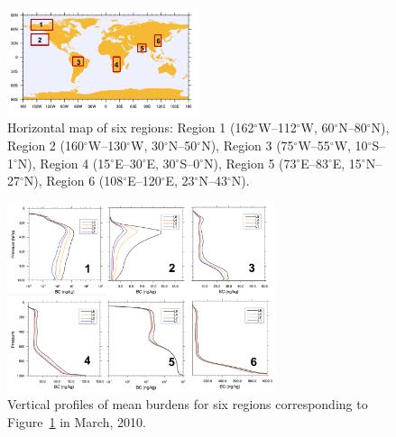 \documentclass[12pt, fullpage]{uiucthesis2009}
\begin{document}
	\begin{figure}[h] 
		\begin{center}
			\includegraphics[width = 0.5\textwidth]{Figure15}
			\caption[Horizontal map of six regions]{\label{fig_P15} Horizontal map of six regions: Region 1 (162$^\circ$W--112$^\circ$W, 60$^\circ$N--80$^\circ$N), Region 2 (160$^\circ$W--130$^\circ$W, 30$^\circ$N--50$^\circ$N), Region 3 (75$^\circ$W--55$^\circ$W, 10$^\circ$S--1$^\circ$N), Region 4 (15$^\circ$E--30$^\circ$E, 30$^\circ$S--0$^\circ$N), Region 5 (73$^\circ$E--83$^\circ$E, 15$^\circ$N--27$^\circ$N), Region 6 (108$^\circ$E--120$^\circ$E, 23$^\circ$N--43$^\circ$N).}
		\end{center}
	\end{figure}
	
	\begin{figure}[h] 
		\begin{center}
			\includegraphics[width = 0.7\textwidth]{Figure14}
			\caption[Vertical profiles of mean  burdens for six regions corresponding to Figure~\ref{fig_P15} in March, 2010]{\label{fig_P14} Vertical profiles of mean  burdens for six regions corresponding to Figure~\ref{fig_P15} in March, 2010.}
		\end{center}
	\end{figure}
	
\end{document}
